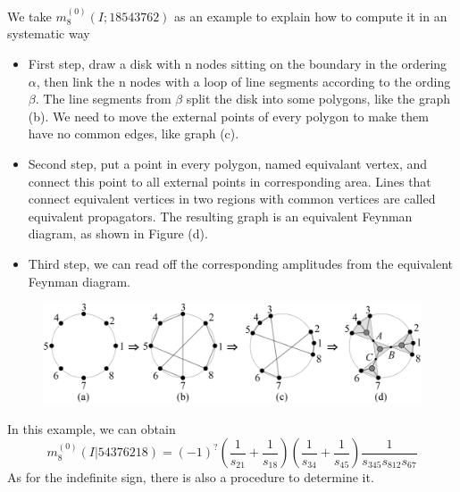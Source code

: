 \documentclass{beamer}
\begin{document}
\begin{frame}
    We take $m_8^{(0)}(I;18543762)$ as an example to explain how to compute it in an systematic way
    \begin{itemize}
        \item First step, draw a disk with n nodes sitting on the boundary in the ordering $\alpha$, then link the n nodes with a loop of line segments according to
              the ording $\beta$. The line segments from $\beta$ split the disk into some polygons, like the graph (b). We need to move the external points of every polygon
              to make them have no common edges, like graph (c).
        \item Second step, put a point in every polygon, named equivalant vertex, and connect this point to all external points in corresponding area. Lines that connect equivalent 
              vertices in two regions with common vertices are called equivalent propagators. The resulting graph is an equivalent Feynman diagram, as shown in Figure (d).
    \end{itemize}
\end{frame}
\begin{frame}
    \begin{itemize}
        \item Third step, we can read off the corresponding amplitudes from the equivalent Feynman diagram. 
    \end{itemize}
    \begin{figure}
        \centering
        \includegraphics[width=1\linewidth]{7.png}
    \end{figure}
    In this example, we can obtain 
    \begin{equation*}
        m_8^{(0)}(I|54376218)=(-1)^?\left(\frac{1}{s_{21}}+\frac{1}{s_{18}}\right)\left(\frac{1}{s_{34}}+\frac{1}{s_{45}}\right)\frac{1}{s_{345}s_{812}s_{67}}
    \end{equation*}
    As for the indefinite sign, there is also a procedure to determine it.
\end{frame}
\end{document}
